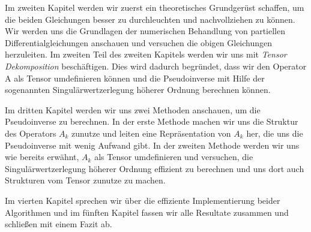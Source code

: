 Im zweiten Kapitel werden wir zuerst ein theoretisches Grundgerüst schaffen, um die beiden Gleichungen besser zu durchleuchten und nachvollziehen zu können. Wir werden uns die Grundlagen der numerischen Behandlung von partiellen Differentialgleichungen anschauen und versuchen die obigen Gleichungen herzuleiten.
Im zweiten Teil des zweiten Kapitels werden wir uns mit \textit{Tensor Dekomposition} beschäftigen. Dies wird dadurch begründet, dass wir den Operator A als Tensor umdefinieren können und die Pseudoinverse mit Hilfe der sogenannten Singulärwertzerlegung höherer Ordnung berechnen können.

Im dritten Kapitel werden wir uns zwei Methoden anschauen, um die Pseudoinverse zu berechnen. In der erste Methode machen wir uns die Struktur des Operators $A_k$ zunutze und leiten eine Repräsentation von $A_k$ her, die uns die Pseudoinverse mit wenig Aufwand gibt. In der zweiten Methode werden wir uns wie bereits erwähnt, $A_k$ als Tensor umdefinieren und versuchen, die Singulärwertzerlegung höherer Ordnung effizient zu berechnen und uns dort auch Strukturen vom Tensor zunutze zu machen.

Im vierten Kapitel sprechen wir über die effiziente Implementierung beider Algorithmen und im fünften Kapitel fassen wir alle Resultate zusammen und schließen mit einem Fazit ab.





